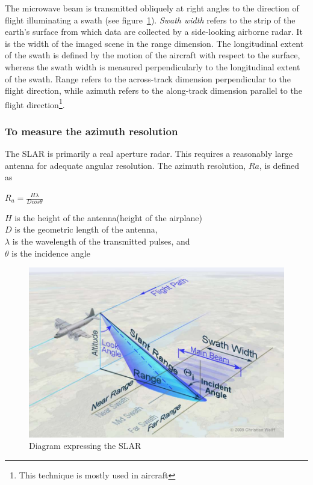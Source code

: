 The microwave beam is transmitted obliquely at right angles to the direction of flight illuminating a swath (see figure~\ref{fig:slar2}). \textit{Swath width} refers to the strip of the earth's surface from which data are collected by a side-looking airborne radar. It is the width of the imaged scene in the range dimension. The longitudinal extent of the swath is defined by the motion of the aircraft with respect to the surface, whereas the swath width is measured perpendicularly to the longitudinal extent of the swath. Range refers to the across-track dimension perpendicular to the flight direction, while azimuth refers to the along-track dimension parallel to the flight direction\footnote{This technique is mostly used in aircraft}.

\subsubsection*{To measure the azimuth resolution}
The SLAR is primarily a real aperture radar. This requires a reasonably large antenna for adequate angular resolution. The azimuth resolution, $ Ra $, is defined as

\begin{center}
$R_{a}=\frac{H \lambda}{D cos\theta}$
\end{center}
$ H $ is the height of the antenna(height of the airplane)\\
$ D $ is the geometric length of the antenna,\\
$\lambda$ is the wavelength of the transmitted pulses, and\\
$\theta$ is the incidence angle

\begin{figure}[h]
\centering
\includegraphics[scale=0.3]{./graphics/SLAR2}
\caption{Diagram expressing the SLAR}
\label{fig:slar2}
\end{figure}

